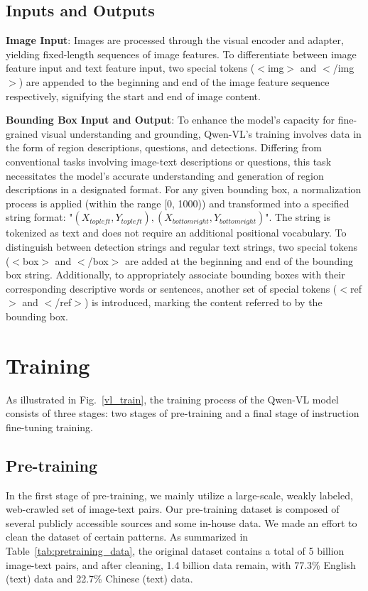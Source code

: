 \documentclass{article}
\begin{document}
\subsection{Inputs and Outputs}
\textbf{Image Input}: Images are processed through the visual encoder and adapter, yielding fixed-length sequences of image features. To differentiate between image feature input and text feature input, two special tokens ($<$img$>$ and $<$/img$>$) are appended to the beginning and end of the image feature sequence respectively, signifying the start and end of image content. 

\textbf{Bounding Box Input and Output}: To enhance the model's capacity for fine-grained visual understanding and grounding, Qwen-VL's training involves data in the form of region descriptions, questions, and detections. Differing from conventional tasks involving image-text descriptions or questions, this task necessitates the model's accurate understanding and generation of region descriptions in a designated format. For any given bounding box, a normalization process is applied (within the range [0, 1000)) and transformed into a specified string format: "$(X_{top left}, Y_{top left}), (X_{bottom right}, Y_{bottom right})$". The string is tokenized as text and does not require an additional positional vocabulary. To distinguish between detection strings and regular text strings, two special tokens ($<$box$>$ and $<$/box$>$ are added at the beginning and end of the bounding box string. Additionally, to appropriately associate bounding boxes with their corresponding descriptive words or sentences, another set of special tokens ($<$ref$>$ and $<$/ref$>$) is introduced, marking the content referred to by the bounding box.






\section{Training}
As illustrated in Fig.~\ref{vl_train}, the training process of the Qwen-VL model consists of three stages: two stages of pre-training and a final stage of instruction fine-tuning training.

\subsection{Pre-training}



In the first stage of pre-training, we mainly utilize a large-scale, weakly labeled, web-crawled set of image-text pairs. Our pre-training dataset is composed of several publicly accessible sources and some in-house data. We made an effort to clean the dataset of certain patterns. As summarized in Table~\ref{tab:pretraining_data}, the original dataset contains a total of 5 billion image-text pairs, and after cleaning, 1.4 billion data remain, with 77.3\% English (text) data and 22.7\% Chinese (text) data.
\end{document}

